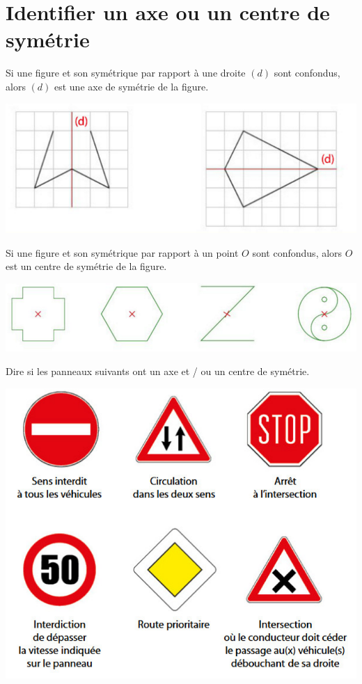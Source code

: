 \documentclass[12pt,a4paper]{article}
\begin{document}
\section{Identifier un axe ou un centre de symétrie}

	\begin{mydef}
		Si une figure et son symétrique par rapport à une droite $(d)$ sont confondus, alors $(d)$ est une axe de symétrie de la figure.
	\end{mydef}

	\begin{myexs}
		\begin{center}
			\includegraphics[scale=0.7]{axes}
		\end{center}
	\end{myexs}

	\begin{mydef}
		Si une figure et son symétrique par rapport à un point $O$ sont confondus, alors $O$ est un centre de symétrie de la figure.
	\end{mydef}

	\begin{myexs}
		\begin{center}
			\includegraphics[scale=0.6]{centres}
		\end{center}
	\end{myexs}


	\begin{myapp}
		Dire si les panneaux suivants ont un axe et / ou un centre de symétrie.
		
		\begin{center}
			\includegraphics[scale=0.43]{app}
		\end{center}
	\end{myapp}
\end{document}
